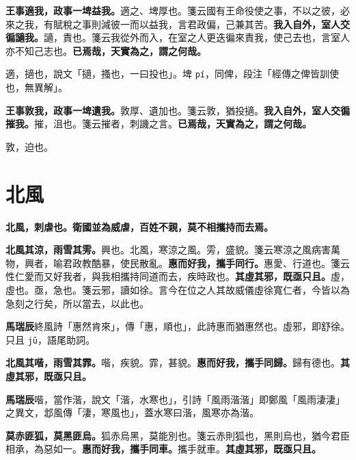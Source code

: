 \textbf{王事適我，政事一埤益我。}{\footnotesize 適之、埤厚也。箋云國有王命役使之事，不以之彼，必來之我，有賦稅之事則減彼一而以益我，言君政偏，己兼其苦。}\textbf{我入自外，室人交徧讁我。}{\footnotesize 讁，責也。箋云我從外而入，在室之人更迭徧來責我，使己去也，言室人亦不知己志也。}\textbf{已焉哉，天實為之，謂之何哉。}

\begin{quoting}適，擿也，說文「擿，搔也，一曰投也」。埤 \texttt{pí}，同俾，段注「經傳之俾皆訓使也，無異解」。\end{quoting}

\textbf{王事敦我，政事一埤遺我。}{\footnotesize 敦厚、遺加也。箋云敦，猶投擿。}\textbf{我入自外，室人交徧摧我。}{\footnotesize 摧，沮也。箋云摧者，刺譏之言。}\textbf{已焉哉，天實為之，謂之何哉。}

\begin{quoting}敦，迫也。\end{quoting}

\section{北風}


\textbf{北風，刺虐也。衛國並為威虐，百姓不親，莫不相攜持而去焉。}

\textbf{北風其涼，雨雪其雱。}{\footnotesize 興也。北風，寒涼之風。雱，盛貌。箋云寒涼之風病害萬物，興者，喻君政教酷暴，使民散亂。}\textbf{惠而好我，攜手同行。}{\footnotesize 惠愛、行道也。箋云性仁愛而又好我者，與我相攜持同道而去，疾時政也。}\textbf{其虛其邪，既亟只且。}{\footnotesize 虛，虛也。亟，急也。箋云邪，讀如徐。言今在位之人其故威儀虛徐寬仁者，今皆以為急刻之行矣，所以當去，以此也。}

\begin{quoting}\textbf{馬瑞辰}終風詩「惠然肯來」，傳「惠，順也」，此詩惠而猶惠然也。虛邪，即舒徐。只且 \texttt{jū}，語尾助詞。\end{quoting}

\textbf{北風其喈，雨雪其霏。}{\footnotesize 喈，疾貌。霏，甚貌。}\textbf{惠而好我，攜手同歸。}{\footnotesize 歸有德也。}\textbf{其虛其邪，既亟只且。}

\begin{quoting}\textbf{馬瑞辰}喈，當作湝，說文「湝，水寒也」，引詩「風雨湝湝」即鄭風「風雨淒淒」之異文，邶風傳「淒，寒風也」，蓋水寒曰湝，風寒亦為湝。\end{quoting}

\textbf{莫赤匪狐，莫黑匪烏。}{\footnotesize 狐赤烏黑，莫能別也。箋云赤則狐也，黑則烏也，猶今君臣相承，為惡如一。}\textbf{惠而好我，攜手同車。}{\footnotesize 攜手就車。}\textbf{其虛其邪，既亟只且。}

